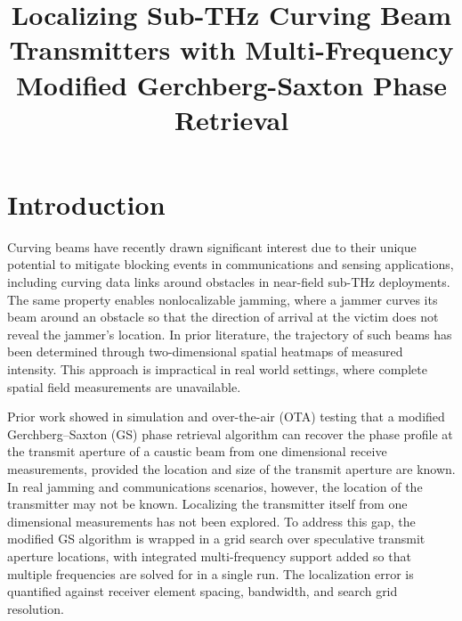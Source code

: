 \documentclass[11pt]{IEEEtran}
\begin{document}
%
\title{Localizing Sub-THz Curving Beam Transmitters with Multi-Frequency Modified Gerchberg-Saxton Phase Retrieval}


\author{
}

\maketitle


\IEEEpeerreviewmaketitle

\section{Introduction}

Curving beams have recently drawn significant interest due to their unique potential to mitigate blocking events in communications and sensing applications, including curving data links around obstacles in near-field sub-THz deployments\cite{CurvingData}.
The same property enables nonlocalizable jamming, where a jammer curves its beam around an obstacle so that the direction of arrival at the victim does not reveal the jammer's location\cite{spindel_jamming}.
In prior literature, the trajectory of such beams has been determined through two-dimensional spatial heatmaps of measured intensity\cite{AiryObservation, spindel_ms}.
This approach is impractical in real world settings, where complete spatial field measurements are unavailable.

Prior work showed in simulation and over-the-air (OTA) testing that a modified Gerchberg--Saxton (GS) phase retrieval algorithm can recover the phase profile at the transmit aperture of a caustic beam\cite{Froehly, beam_tutorial} from one dimensional receive measurements, provided the location and size of the transmit aperture are known.
In real jamming and communications scenarios, however, the location of the transmitter may not be known.
Localizing the transmitter itself from one dimensional measurements has not been explored.
To address this gap, the modified GS algorithm is wrapped in a grid search over speculative transmit aperture locations, with integrated multi-frequency support added so that multiple frequencies are solved for in a single run.
The localization error is quantified against receiver element spacing, bandwidth, and search grid resolution.
\end{document}
